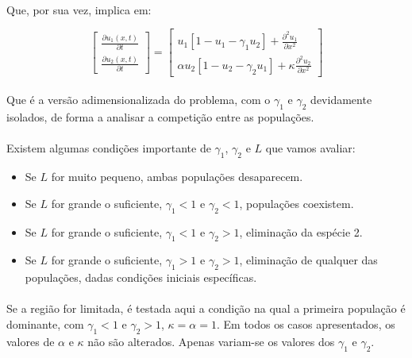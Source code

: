 \documentclass{article}
\begin{document}
	\paragraph{}
	Que, por sua vez, implica em:
	
	$$\left[ \begin{array}{c}
		\frac{\partial u_1(x,t)}{\partial t} \\
		\frac{\partial u_2(x,t)}{\partial t} \end{array} \right]
	=
	\left[ \begin{array}{cc}
		u_1 \left[1 - u_1  - \gamma_1 u_2 \right] +  \frac{\partial^2 u_1}{\partial x^2} \\
		\alpha u_2 \left[1 - u_2  - \gamma_2 u_1 \right] + \kappa \frac{\partial^2 u_2}{\partial x^2} \end{array} \right]$$
	
	\paragraph{}
	Que é a versão adimensionalizada do problema, com o $\gamma_1$ e $\gamma_2$ devidamente isolados, de forma a analisar a competição entre as populações.
	
	\paragraph{}
	Existem algumas condições importante de $\gamma_1$, $\gamma_2$ e $L$ que vamos avaliar:
	
	\begin{itemize}
		\item Se $L$ for muito pequeno, ambas populações desaparecem.
		\item Se $L$ for grande o suficiente, $\gamma_1 < 1$ e $\gamma_2 < 1$, populações coexistem.
		\item Se  $L$ for grande o suficiente, $\gamma_1 < 1$ e $\gamma_2 > 1$, eliminação da espécie 2.
		\item Se   $L$ for grande o suficiente, $\gamma_1 > 1$ e $\gamma_2 > 1$, eliminação de qualquer das populações, dadas condições iniciais específicas.	
	\end{itemize}

	\paragraph{}
	Se a região for limitada, é testada aqui a condição na qual a primeira população é dominante, com $\gamma_1 < 1$ e $\gamma_2 > 1$, $\kappa = \alpha = 1$. Em todos os casos apresentados, os valores de $\alpha$ e $\kappa$ não são alterados. Apenas variam-se os valores dos $\gamma_1$ e $\gamma_2$.
	
\end{document}
